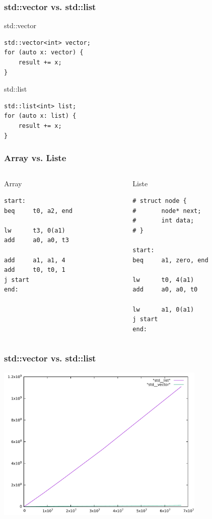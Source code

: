 \documentclass[xcolor=pdftex,dvipsnames,table]{beamer}
\begin{document}
\begin{frame}[fragile]
	\frametitle{std::vector vs. std::list}
	\begin{block}{std::vector}
	\begin{lstlisting}	
std::vector<int> vector;
for (auto x: vector) {
	result += x;
}
	\end{lstlisting}
\end{block}	
\begin{block}{std::list}	
	\begin{lstlisting}	
std::list<int> list;
for (auto x: list) {
	result += x;
}
	\end{lstlisting}
\end{block}
\end{frame}

\begin{frame}[fragile]
	\frametitle{Array vs. Liste}
	\begin{columns}
		\begin{column}{0.5\textwidth}
\begin{block}{Array}
\begin{lstlisting}	
start:
beq     t0, a2, end

lw      t3, 0(a1)
add     a0, a0, t3

add     a1, a1, 4
add     t0, t0, 1
j start
end:
\end{lstlisting}
\end{block}
		\end{column}
		\begin{column}{0.5\textwidth}
			\begin{block}{Liste}
\begin{lstlisting}	
# struct node {
#       node* next;
#       int data;
# }

start:
beq     a1, zero, end

lw      t0, 4(a1)
add     a0, a0, t0

lw      a1, 0(a1)
j start
end:
\end{lstlisting}
\end{block}
		\end{column}
	\end{columns}
\end{frame}

\begin{frame}
	\frametitle{std::vector vs. std::list}
	
	\includegraphics[width=10cm]{vector_list_result.pdf}
\end{frame}
\end{document}
